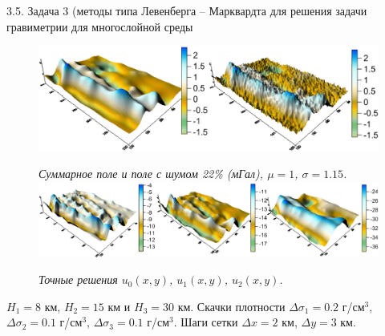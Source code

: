 \documentclass[10pt,pdf, mathserif, hyperref={unicode}]{beamer}
\begin{document}
\begin{frame}{\small 3.5. Задача 3 (методы типа Левенберга -- Марквардта для решения задачи гравиметрии для многослойной среды}
	\begin{figure}
		\centering
		\includegraphics[height=0.2\textheight]{fields}
		
		\centering\textit{Суммарное поле и поле с шумом 22\% (мГал), $\mu=1$, $\sigma=1.15$.}
		\centering
		\includegraphics[height=0.2\textheight]{exact_hor}
		
		\centering\textit{Точные решения $u_0(x,y)$, $u_1(x,y)$, $u_2(x,y)$.}
	\end{figure}
	
	$H_1=8$ км, $H_2=15$ км и $H_3=30$ км. Скачки плотности $\Delta\sigma_1=0.2$ г/см$^3$, $\Delta\sigma_2=0.1$ г/см$^3$, $\Delta\sigma_3=0.1$ г/см$^3$. Шаги сетки $\Delta x=2$ км, $\Delta y=3$ км.
\end{frame}
\end{document}
